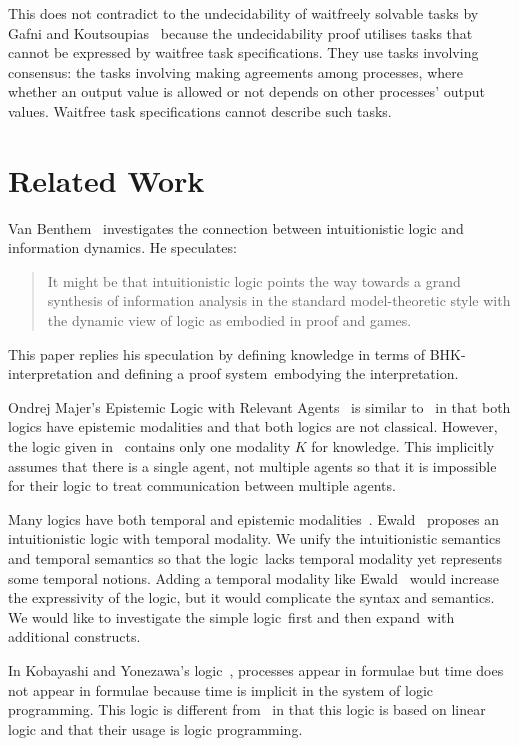   This does not contradict to the undecidability
  of waitfreely solvable tasks by Gafni and
  Koutsoupias~\cite{gafni1999three}
  because the undecidability proof
  utilises tasks that cannot be expressed by waitfree task specifications.
  They use tasks involving consensus:
  the tasks involving making agreements among processes, where
  whether an output value is allowed or not depends on other processes'
  output values.  Waitfree task specifications cannot describe such tasks.

 \section{Related Work}
 \label{first:related}

 Van Benthem~\cite{van2009information} investigates the connection between
 intuitionistic logic and information dynamics.  He speculates:
 \begin{quotation}
  It might be
  that intuitionistic logic points the way towards a grand synthesis of information analysis
  in the standard model-theoretic style with the dynamic view of logic as embodied
  in proof and games.
 \end{quotation}
 This paper replies his speculation by defining knowledge in terms of BHK-interpretation
 and defining a proof system \iec\,embodying the interpretation.

 Ondrej Majer's
 Epistemic Logic with Relevant Agents~\cite{majer-epistemic}
 is similar to \iec\, in that both logics have epistemic modalities and that both logics are
 not classical.
 However, the logic given in~\cite{majer-epistemic}
 contains only one modality $K$ for knowledge.
 This implicitly assumes that there is a single agent, not multiple agents so that it is
 impossible for their logic to treat communication between multiple agents.

 Many logics have both temporal and epistemic modalities~\cite{sato13study, wozna2005logic}.
 Ewald~\cite{1986} proposes an intuitionistic logic with temporal modality.
 We unify the intuitionistic semantics and temporal semantics so that the logic
 \iec\,lacks temporal modality yet represents some temporal notions.
 Adding a temporal modality like Ewald~\cite{1986} would increase the expressivity of the
 logic, but it would complicate the syntax and semantics.
 We would like to investigate the simple logic \iec\,first
 and then expand \iec\,with
 additional constructs.

 In Kobayashi and Yonezawa's logic~\cite{kobayashi1995asynchronous}, processes
 appear in formulae but time does not appear in formulae
 because time is implicit in the system of logic programming.
 This logic is different from \iec\, in that this logic is based on linear logic and that their
 usage is logic programming.

